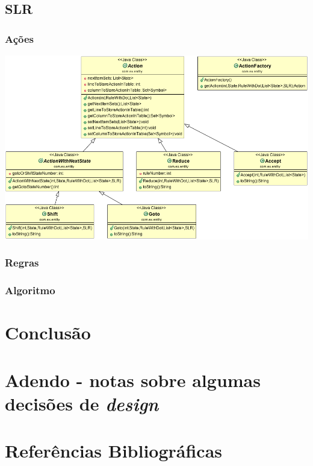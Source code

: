 \documentclass[11pt]{article}
\begin{document}
\subsection{SLR}
\label{sec:orgheadline11}
\subsubsection{Ações}
\label{sec:orgheadline8}

\includegraphics[width=.9\linewidth]{./media/actions.png}

\subsubsection{Regras}
\label{sec:orgheadline9}
\subsubsection{Algoritmo}
\label{sec:orgheadline10}
\section{Conclusão}
\label{sec:orgheadline13}
\section{Adendo - notas sobre algumas decisões de \emph{design}}
\label{sec:orgheadline14}
\section{Referências Bibliográficas}
\label{sec:orgheadline15}
\end{document}
